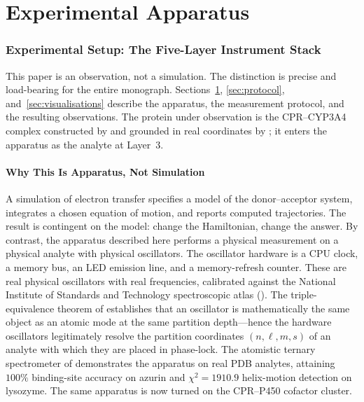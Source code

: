\documentclass[11pt,twocolumn,a4paper]{article}
\theoremstyle{definition}
\theoremstyle{remark}
\begin{document}
\part{Experimental Apparatus}

\section{Experimental Setup: The Five-Layer Instrument Stack}
\label{sec:apparatus}

This paper is an observation, not a simulation. The distinction is precise
and load-bearing for the entire monograph. Sections~\ref{sec:apparatus},
\ref{sec:protocol}, and~\ref{sec:visualisations} describe the apparatus,
the measurement protocol, and the resulting observations. The protein
under observation is the CPR--CYP3A4 complex constructed by
\citep{sachikonye2025_paper1, sachikonye2025_paper2, sachikonye2025_paper3}
and grounded in real coordinates by \citep{sachikonye2025_paper25}; it
enters the apparatus as the analyte at Layer~3.

\subsection{Why This Is Apparatus, Not Simulation}
\label{sec:why_apparatus}

A simulation of electron transfer specifies a model of the donor--acceptor
system, integrates a chosen equation of motion, and reports computed
trajectories. The result is contingent on the model: change the
Hamiltonian, change the answer. By contrast, the apparatus described here
performs a physical measurement on a physical analyte with physical
oscillators. The oscillator hardware is a CPU clock, a memory bus, an LED
emission line, and a memory-refresh counter. These are real physical
oscillators with real frequencies, calibrated against the National
Institute of Standards and Technology spectroscopic atlas
(\citep{sachikonye2025_hyperfine}). The triple-equivalence theorem of
\citep{sachikonye2025_specderiv} establishes that an oscillator is
mathematically the same object as an atomic mode at the same partition
depth---hence the hardware oscillators legitimately resolve the partition
coordinates $(n, \ell, m, s)$ of an analyte with which they are placed in
phase-lock. The atomistic ternary spectrometer of
\citep{sachikonye2025_atomicspec} demonstrates the apparatus on real PDB
analytes, attaining $100\%$ binding-site accuracy on azurin and
$\chi^2 = 1910.9$ helix-motion detection on lysozyme. The same apparatus
is now turned on the CPR--P450 cofactor cluster.
\end{document}
